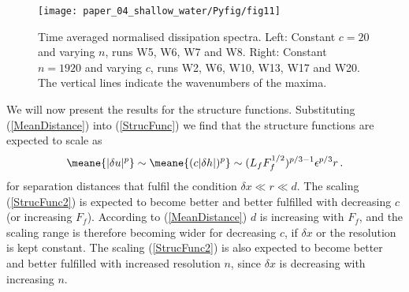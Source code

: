 \begin{figure}
\centerline{\texttt{[image: paper\_04\_shallow\_water/Pyfig/fig11]}}
\caption{Time averaged normalised dissipation spectra. Left: Constant $ c = 20 $ and varying $ n $, runs  W5, W6, W7 and W8. Right: Constant $ n= 1920 $ and varying $ c $, runs W2, W6, W10, W13, W17 and W20. The vertical lines indicate the wavenumbers of the maxima.}
\label{fig_disspectra}
\end{figure}



We will now present the results for the structure functions. Substituting
(\ref{MeanDistance}) into (\ref{StrucFunc}) we find that the structure
functions are expected to scale as
\begin{equation} \label{StrucFunc2}
\meane{|\delta u |^p}  \sim \meane{(c|\delta h |)^p} \sim  (L_f F_f^{1/2})^{p/3-1}  \epsilon^{p/3}  r  \, .
\end{equation}
for separation distances that fulfil the condition $ \delta x \ll r \ll d $.
The scaling (\ref{StrucFunc2}) is
expected to become better and better fulfilled with decreasing $ c $ (or
increasing $ F_f $). According to (\ref{MeanDistance})
$ d $ is increasing with $ F_f $, and the scaling range is therefore becoming
wider for decreasing $ c $, if $ \delta x $ or the resolution  is kept
constant. The scaling
(\ref{StrucFunc2}) is also expected to become better and better fulfilled with
increased resolution $ n $, since $ \delta x $ is decreasing with increasing $
n $.

